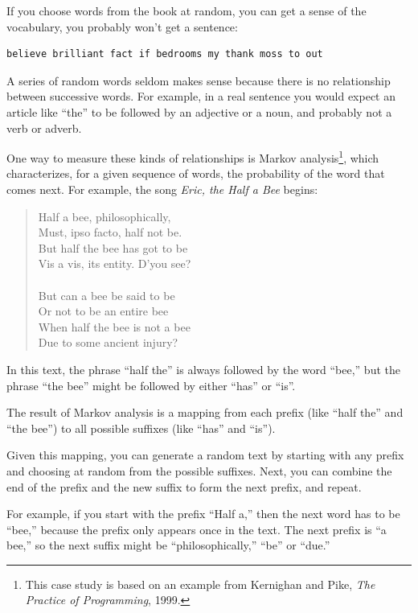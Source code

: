 \documentclass[10pt]{book}
\begin{document}
If you choose words from the book at random, you can get a
sense of the vocabulary, you probably won't get a sentence:
\beforeverb
\begin{verbatim}
believe brilliant fact if bedrooms my thank moss to out
\end{verbatim}
\afterverb
%
A series of random words seldom makes sense because there
is no relationship between successive words.  For example, in
a real sentence you would expect an article like ``the'' to
be followed by an adjective or a noun, and probably not a verb
or adverb.

One way to measure these kinds of relationships is Markov
analysis\footnote{This case study is based on an example from
  Kernighan and Pike, {\em The Practice of Programming}, 1999.}, which
characterizes, for a given sequence of words, the probability of the
word that comes next.  For example, the song {\em Eric, the Half a
  Bee} begins:

\begin{quote}
Half a bee, philosophically, \\
Must, ipso facto, half not be. \\
But half the bee has got to be \\
Vis a vis, its entity. D'you see? \\
\\
But can a bee be said to be \\
Or not to be an entire bee \\
When half the bee is not a bee \\
Due to some ancient injury? \\
\end{quote}
%
In this text,
the phrase ``half the'' is always followed by the word ``bee,''
but the phrase ``the bee'' might be followed by either
``has'' or ``is''.


The result of Markov analysis is a mapping from each prefix
(like ``half the'' and ``the bee'') to all possible suffixes
(like ``has'' and ``is'').


Given this mapping, you can generate a random text by
starting with any prefix and choosing at random from the
possible suffixes.  Next, you can combine the end of the
prefix and the new suffix to form the next prefix, and repeat.

For example, if you start with the prefix ``Half a,'' then the
next word has to be ``bee,'' because the prefix only appears
once in the text.  The next prefix is ``a bee,'' so the
next suffix might be ``philosophically,'' ``be'' or ``due.''
\end{document}
